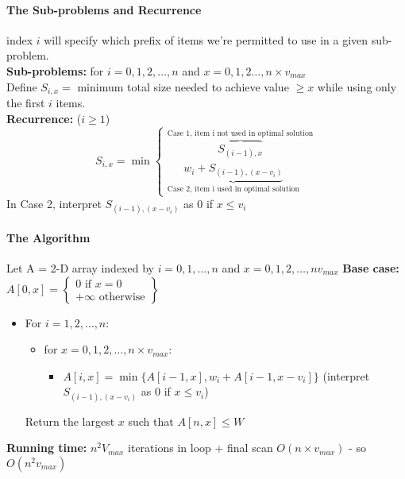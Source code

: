 \documentclass{scrartcl}
\begin{document}
\paragraph{The Sub-problems and Recurrence}
index $i$ will specify which prefix of items we're permitted to use in a given
sub-problem. \\
{\bf Sub-problems: } for $i = 0, 1, 2, \dots , n$ and $x = 0, 1, 2 \dots, n
\times v_{max}$\\
Define $S_{i, x} =$ minimum total size needed to achieve value $\geq x$ while
using only the first $i$ items.\\
{\bf Recurrence: } ($i \geq 1$)\\
$$S_{i, x} = \min \left\{ \begin{smallmatrix} \overbrace{S_{(i-1),
        x}}^{\text{Case 1, item i not used in optimal solution}} \\
\underbrace{w_i + S_{(i-1), (x-v_i)}}_{\text{Case 2, item i used in optimal    solution}} 
\end{smallmatrix} \right.  $$
In Case 2, interpret $ S_{(i-1), (x-v_i)}$ as 0 if $x \leq v_i$

\paragraph{The Algorithm}
Let A = 2-D array indexed by $i = 0, 1, \dots, n$ and $x = 0, 1, 2, \dots, n
v_{max}$ {\bf Base case: } $A[0, x] = \left\{
  \begin{smallmatrix} 0 \text{ if } x = 0 \\ +\infty \text{ otherwise}
  \end{smallmatrix} \right\} $

\begin{itemize}
\item For $i = 1, 2, \dots, n$:
  \begin{itemize}
  \item for $x = 0, 1, 2, \dots, n \times v_{max}$:
    \begin{itemize}
    \item $A[i, x] = \min \{A[i-1, x], w_i + A[i-1, x-v_i]\}$ (interpret  $
      S_{(i-1), (x-v_i)}$ as 0 if $x \leq v_i$) 
    \end{itemize}
  \end{itemize}
Return the largest $x$ such that $A[n, x] \leq W$
\end{itemize}
{\bf Running time: } $n^2 V_{max}$ iterations in loop + final scan $O(n \times
v_{max})$ - so $O(n^2 v_{max})$
\end{document}
